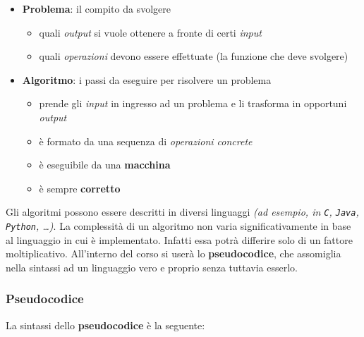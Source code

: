 \documentclass[italian, 10pt]{article}
\begin{document}
\begin{itemize}
  \item \textbf{Problema}: il compito da svolgere
        \begin{itemize}
          \item quali \textit{output} si vuole ottenere a fronte di certi \textit{input}
          \item quali \textit{operazioni} devono essere effettuate (la funzione che deve svolgere)
        \end{itemize}
  \item \textbf{Algoritmo}: i passi da eseguire per risolvere un problema
        \begin{itemize}
          \item prende gli \textit{input} in ingresso ad un problema e li trasforma in opportuni \textit{output}
          \item è formato da una sequenza di \textit{operazioni concrete}
          \item è eseguibile da una \textbf{macchina}
          \item è sempre \textbf{corretto}
        \end{itemize}
\end{itemize}

Gli algoritmi possono essere descritti in diversi linguaggi \textit{(ad esempio, in \texttt{C}, \texttt{Java}, \texttt{Python}, \ldots)}.
La complessità di un algoritmo non varia significativamente in base al linguaggio in cui è implementato.
Infatti essa potrà differire solo di un fattore moltiplicativo.
All'interno del corso si userà lo \textbf{pseudocodice}, che assomiglia nella sintassi ad un linguaggio vero e proprio senza tuttavia esserlo.

\subsubsection{Pseudocodice}

La sintassi dello \textbf{pseudocodice} è la seguente:
\end{document}
